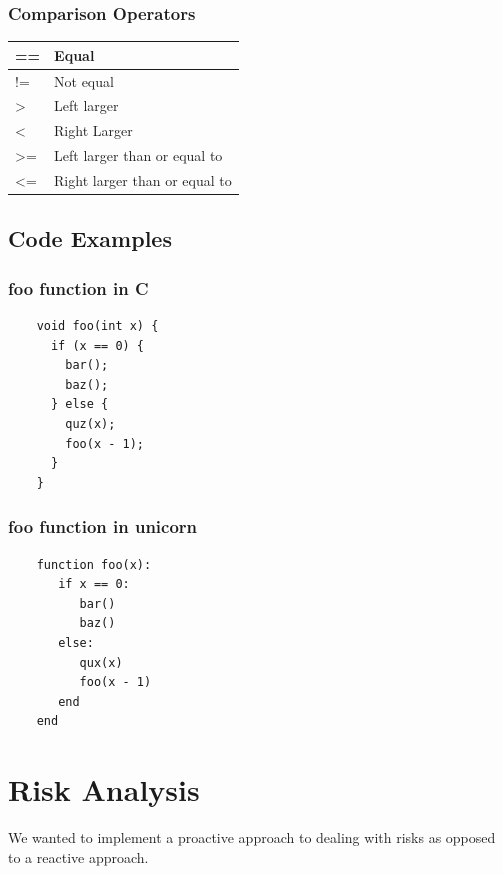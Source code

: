 \documentclass[a4paper,12pt]{article}
\begin{document}
\begin{multicols}{2}
  \subsubsection*{Comparison Operators}
  \begin{tabular}{| l | l | } \hline
    == & Equal \\ \hline
    != & Not equal \\ \hline
    \textgreater & Left larger \\ \hline
    \textless & Right Larger \\ \hline
    \textgreater= & Left larger than or equal to \\ \hline
    \textless= & Right larger than or equal to \\ \hline
  \end{tabular}

\end{multicols}

\subsection*{Code Examples}
\begin{multicols}{2}
  \subsubsection*{foo function in C}
  \begin{lstlisting}
    void foo(int x) {
      if (x == 0) {
        bar();
        baz();
      } else {
        quz(x);
        foo(x - 1);
      }
    }
  \end{lstlisting}
  \subsubsection*{foo function in unicorn}
  \begin{lstlisting}
    function foo(x):
       if x == 0:
          bar()
          baz()
       else:
          qux(x)
          foo(x - 1)
       end
    end
  \end{lstlisting}
\end{multicols}

\pagebreak
\section*{Risk Analysis}

We wanted to implement a proactive approach to dealing with risks as opposed to a reactive approach.
\end{document}
